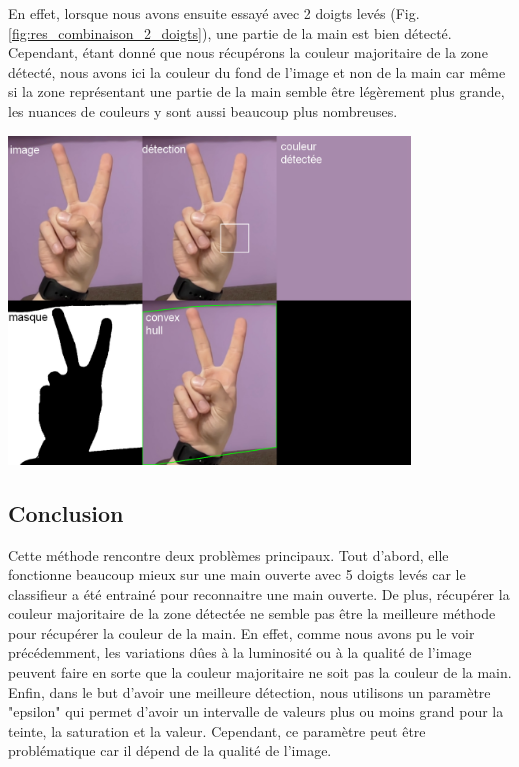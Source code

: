 \documentclass[11pt]{article}
\begin{document}
En effet, lorsque nous avons ensuite essayé avec 2 doigts levés (Fig. \ref{fig:res_combinaison_2_doigts}), une partie de la main est bien détecté. Cependant, étant donné que nous récupérons la couleur majoritaire de la zone détecté, nous avons ici la couleur du fond de l'image et non de la main car même si la zone représentant une partie de la main semble être légèrement plus grande, les nuances de couleurs y sont aussi beaucoup plus nombreuses.
\begin{center}
    \includegraphics[width=0.8\textwidth]{images/res_combinaison_2_doigts.png}
    \label{fig:res_combinaison_2_doigts}
\end{center}

\subsection{Conclusion}
Cette méthode rencontre deux problèmes principaux. Tout d'abord, elle fonctionne beaucoup mieux sur une main ouverte avec 5 doigts levés car le classifieur a été entrainé pour reconnaitre une main ouverte. 
De plus, récupérer la couleur majoritaire de la zone détectée ne semble pas être la meilleure méthode pour récupérer la couleur de la main. En effet, comme nous avons pu le voir précédemment, les variations dûes à la luminosité ou à la qualité de l'image peuvent faire en sorte que la couleur majoritaire ne soit pas la couleur de la main. Enfin, dans le but d'avoir une meilleure détection, nous utilisons un paramètre "epsilon" qui permet d'avoir un intervalle de valeurs plus ou moins grand pour la teinte, la saturation et la valeur. Cependant, ce paramètre peut être problématique car il dépend de la qualité de l'image.
\end{document}
